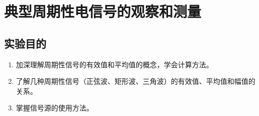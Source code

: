 \documentclass[UTF8]{article}
\begin{document}
    \section{典型周期性电信号的观察和测量}
        \subsection{实验目的}
            \begin{enumerate}[label=\textbf{\arabic*}.]
                \item 加深理解周期性信号的有效值和平均值的概念，学会计算方法。
                \item 了解几种周期性信号（正弦波、矩形波、三角波）的有效值、平均值和幅值的关系。
                \item 掌握信号源的使用方法。 
            \end{enumerate}
\end{document}
